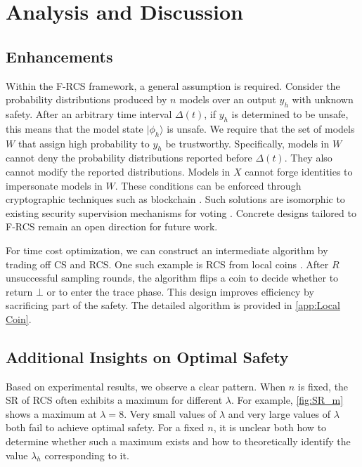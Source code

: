 \section{Analysis and Discussion}
\subsection{Enhancements}

Within the F-RCS framework, a general assumption is required. Consider the probability distributions produced by $n$ models over an output $y_h$ with unknown safety. After an arbitrary time interval $\Delta(t)$, if $y_h$ is determined to be unsafe, this means that the model state $\lvert \phi_h \rangle$ is unsafe. We require that the set of models $W$ that assign high probability to $y_h$ be trustworthy. Specifically, models in $W$ cannot deny the probability distributions reported before $\Delta(t)$. They also cannot modify the reported distributions. Models in $X$ cannot forge identities to impersonate models in $W$. These conditions can be enforced through cryptographic techniques such as blockchain \citep{Li2023FISCOBCOS, authors2018Fabric}. Such solutions are isomorphic to existing security supervision mechanisms for voting \citep{yang2021priscore}. Concrete designs tailored to F-RCS remain an open direction for future work.

For time cost optimization, we can construct an intermediate algorithm by trading off CS and RCS. One such example is RCS from local coins \citep{zhang2023waterbear}. After $R$ unsuccessful sampling rounds, the algorithm flips a coin to decide whether to return $\bot$ or to enter the trace phase. This design improves efficiency by sacrificing part of the safety. The detailed algorithm is provided in \autoref{app:Local Coin}.

\subsection{Additional Insights on Optimal Safety}

Based on experimental results, we observe a clear pattern. When $n$ is fixed, the SR of RCS often exhibits a maximum for different $\lambda$. For example, \autoref{fig:SR_m} shows a maximum at $\lambda = 8$. Very small values of $\lambda$ and very large values of $\lambda$ both fail to achieve optimal safety. For a fixed $n$, it is unclear both how to determine whether such a maximum exists and how to theoretically identify the value $\lambda_h$ corresponding to it.





